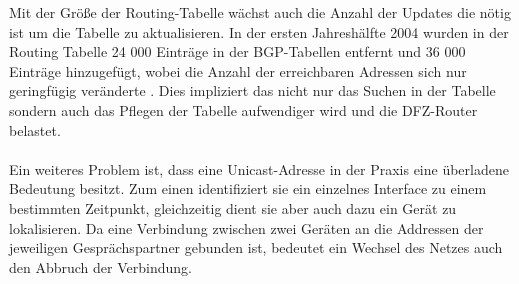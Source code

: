 Mit der Größe der Routing-Tabelle wächst auch die Anzahl der Updates die nötig ist um die Tabelle zu aktualisieren. In der ersten Jahreshälfte 2004 wurden in der Routing Tabelle  24 000 Einträge in der BGP-Tabellen entfernt und 36 000 Einträge hinzugefügt, wobei die Anzahl der erreichbaren Adressen sich nur geringfügig veränderte \cite{journals/ccr/MengXZHLZ04}. Dies impliziert das nicht nur das Suchen in der Tabelle sondern auch das Pflegen der Tabelle aufwendiger wird und die DFZ-Router belastet.

\paragraph{}
Ein weiteres Problem ist, dass eine Unicast-Adresse in der Praxis eine überladene Bedeutung besitzt. Zum einen identifiziert sie ein einzelnes Interface zu einem bestimmten Zeitpunkt, gleichzeitig dient sie aber auch dazu ein Gerät zu lokalisieren. Da eine Verbindung zwischen zwei Geräten an die Addressen der jeweiligen Gesprächspartner gebunden ist, bedeutet ein Wechsel des Netzes auch den Abbruch der Verbindung.


